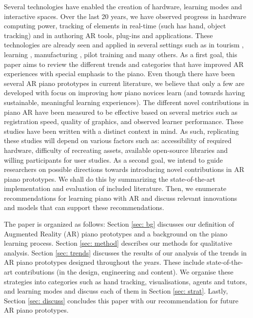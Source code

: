 \documentclass[manuscript,screen]{acmart}
\begin{document}
Several technologies have enabled the creation of hardware, learning modes and interactive spaces. Over the last 20 years, we have observed progress in hardware computing power, tracking of elements in real-time (such has hand, object tracking) and in authoring AR tools, plug-ins and applications. These technologies are already seen and applied in several settings such as in tourism \cite{kounavis2012enhancing}, learning \cite{santos2013augmented}, manufacturing \cite{thomas1992augmented}, pilot training \cite{macchiarella2004augmented} and many others. As a first goal, this paper aims to review the different trends and categories that have improved AR experiences with special emphasis to the piano. Even though there have been several AR piano prototypes in current literature, we believe that only a few are developed with focus on improving how piano novices learn (and towards having sustainable, meaningful learning experiences). The different novel contributions in piano AR have been measured to be effective based on several metrics such as registration speed, quality of graphics, and observed learner performance. These studies have been written with a distinct context in mind. As such, replicating these studies will depend on various factors such as: accessibility of required hardware, difficulty of recreating assets, available open-source libraries and willing participants for user studies. As a second goal, we intend to guide researchers on possible directions towards introducing novel contributions in AR piano prototypes. We shall do this by summarizing the state-of-the-art implementation and evaluation of included literature. Then, we enumerate recommendations for learning piano with AR and discuss relevant innovations and models that can support these recommendations. 

The paper is organized as follows: Section \ref{sec: bg}  discusses our definition of Augmented Reality (AR) piano prototypes and a background on the piano learning process. Section \ref{sec: method} describes our methods for qualitative analysis. Section \ref{sec: trends} discusses the results of our analysis of the trends in AR piano prototypes designed throughout the years. These include state-of-the-art contributions (in the design, engineering and content). We organise these strategies into categories such as hand tracking, visualisations, agents and tutors, and learning modes and discuss each of them in Section \ref{sec: strat}. Lastly, Section \ref{sec: discuss} concludes this paper with our recommendation for future AR piano prototypes. 
\end{document}
